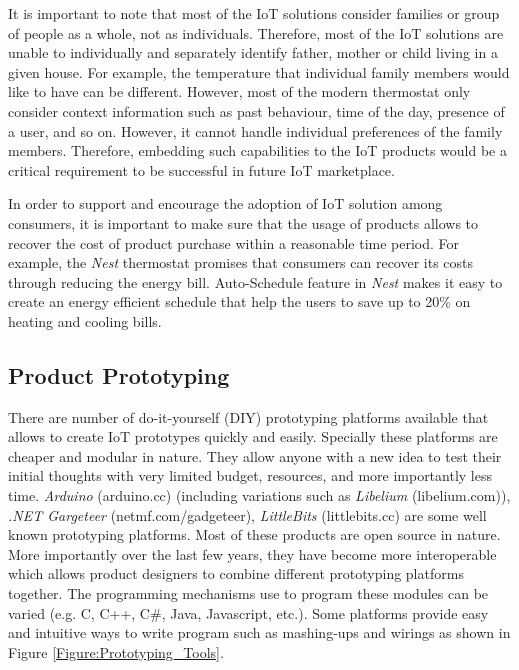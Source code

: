 \documentclass[journal]{IEEEtran}
\begin{document}
 It is important to note that most of the IoT solutions consider families or group of people as a whole, not as individuals. Therefore, most of the IoT solutions are unable to individually and separately identify father, mother or child living in a given house. For example, the temperature that individual family members would like to have can be different. However, most of the modern thermostat only consider context information such as past behaviour, time of the day, presence of a user, and so on. However, it cannot handle individual preferences of the family members. Therefore, embedding such capabilities to the IoT products would be a critical requirement to be successful in  future IoT marketplace.
 
 In order to support and encourage the adoption of IoT solution among consumers, it is important to make sure that the usage of products allows to recover the cost of product purchase within a reasonable time period. For example, the \textit{Nest} thermostat promises that consumers can recover its costs through reducing the energy bill. Auto-Schedule feature in \textit{Nest} makes it easy to create an energy efficient schedule that  help the users to save up to 20\% on  heating and cooling bills.
 
 
 
 
  \subsection{Product Prototyping}
  There are number of do-it-yourself (DIY)  prototyping platforms available that allows to create IoT prototypes quickly and easily. Specially these platforms are cheaper and modular in nature. They allow anyone with a new idea to test their initial thoughts with very limited budget, resources, and more importantly less time.  \textit{Arduino} (arduino.cc) (including variations such as \textit{Libelium} (libelium.com)), \textit{.NET Gargeteer} (netmf.com/gadgeteer), \textit{LittleBits} (littlebits.cc) are some well known prototyping platforms. Most of these products are open source in nature. More importantly over the last few years, they have become more interoperable which allows product designers to combine different prototyping platforms together. The programming mechanisms  use to program these modules can be  varied (e.g. C, C++, C\#, Java, Javascript, etc.). Some platforms provide  easy and intuitive ways to write program such as mashing-ups and wirings as shown in Figure \ref{Figure:Prototyping_Tools}.
  
\end{document}

